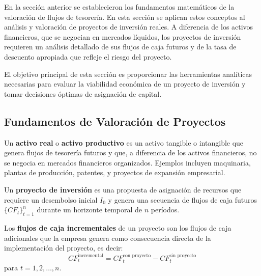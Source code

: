 En la sección anterior se establecieron los fundamentos matemáticos de la valoración de flujos de tesorería. En esta sección se aplican estos conceptos al análisis y valoración de proyectos de inversión reales. A diferencia de los activos financieros, que se negocian en mercados líquidos, los proyectos de inversión requieren un análisis detallado de sus flujos de caja futuros y de la tasa de descuento apropiada que refleje el riesgo del proyecto.

El objetivo principal de esta sección es proporcionar las herramientas analíticas necesarias para evaluar la viabilidad económica de un proyecto de inversión y tomar decisiones óptimas de asignación de capital.

\subsection{Fundamentos de Valoración de Proyectos}

\begin{definicion}
Un \textbf{activo real} o \textbf{activo productivo} es un activo tangible o intangible que genera flujos de tesorería futuros y que, a diferencia de los activos financieros, no se negocia en mercados financieros organizados. Ejemplos incluyen maquinaria, plantas de producción, patentes, y proyectos de expansión empresarial.
\end{definicion}

\begin{definicion}
Un \textbf{proyecto de inversión} es una propuesta de asignación de recursos que requiere un desembolso inicial $I_0$ y genera una secuencia de flujos de caja futuros $\{CF_t\}_{t=1}^{n}$ durante un horizonte temporal de $n$ períodos.
\end{definicion}

\begin{definicion}
Los \textbf{flujos de caja incrementales} de un proyecto son los flujos de caja adicionales que la empresa genera como consecuencia directa de la implementación del proyecto, es decir:
\begin{equation}
CF_t^{\text{incremental}} = CF_t^{\text{con proyecto}} - CF_t^{\text{sin proyecto}}
\end{equation}
para $t = 1, 2, \ldots, n$.
\end{definicion}

\begin{center}
    
\end{center}

